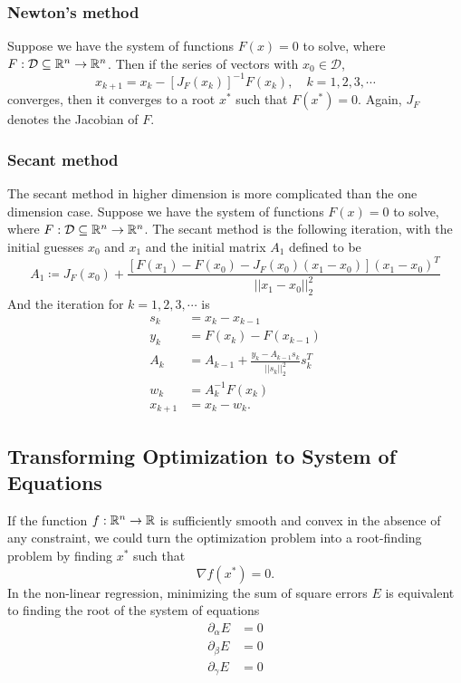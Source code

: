 \begin{table}[H]
\subsubsection{Newton's method}
Suppose we have the system of functions \(F(x)=0\) to solve, where \(F:\mathcal{D}\subseteq\mathbb{R}^{n}\to\mathbb{R}^n\).
Then if the series of vectors with \(x_0\in\mathcal{D}\),
\[ x_{k+1}=x_k-[J_F(x_k)]^{-1}F(x_k), \quad k=1,2,3,\cdots \]
converges, then it converges to a root \(x^*\) such that \(F(x^*)=0\).
Again, \(J_F\) denotes the Jacobian of \(F\).



\subsubsection{Secant method}
The secant method in higher dimension is more complicated than the one dimension case.
Suppose we have the system of functions \(F(x)=0\) to solve, where \(F:\mathcal{D}\subseteq\mathbb{R}^{n}\to\mathbb{R}^n\).
The secant method is the following iteration, with the initial guesses \(x_0\) and \(x_1\) and the initial matrix \(A_1\) defined to be
\[ A_1\coloneqq J_F(x_0)+\frac{\left[F(x_1)-F(x_0)-J_F(x_0)(x_1-x_0)\right](x_1-x_0)^T}{||x_1-x_0||_2^2} \]
And the iteration for \(k=1,2,3,\cdots\) is
\begin{align*}
	s_k&=x_{k}-x_{k-1}\\
	y_k&=F(x_k)-F(x_{k-1})\\
	A_k&=A_{k-1}+\frac{y_k-A_{k-1}s_k}{||s_k||_2^2}s_k^T\\
	w_k&=A_k^{-1}F(x_k)\\
	x_{k+1}&=x_k-w_k.
\end{align*}




\subsection{Transforming Optimization to System of Equations}
If the function \(f:\mathbb{R}^n\to\mathbb{R}\) is sufficiently smooth and convex in the absence of any constraint, we could turn the optimization problem into a root-finding problem by finding \(x^*\) such that
\[ \nabla f(x^*)=0. \]
In the non-linear regression, minimizing the sum of square errors \(E\) is equivalent to finding the root of the system of equations
\begin{equation}\label{eqn3}
\begin{aligned}
\partial_{\alpha}E&=0\\
\partial_{\beta}E&=0\\
\partial_{\gamma}E&=0
\end{aligned}
\end{equation}



\end{table}
